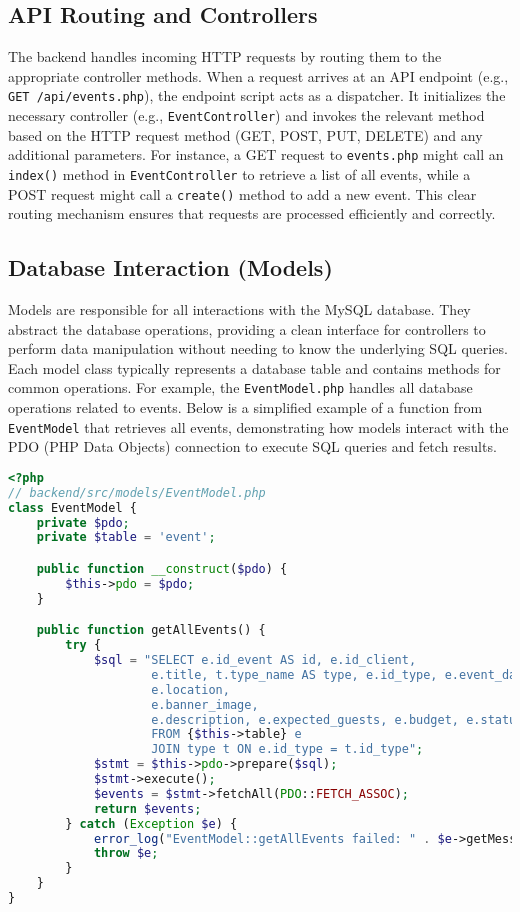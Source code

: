 \documentclass{report}
\begin{document}
\subsection{API Routing and Controllers}
\label{sec:api_routing_controllers}
The backend handles incoming HTTP requests by routing them to the appropriate controller methods. When a request arrives at an API endpoint (e.g., \texttt{GET /api/events.php}), the endpoint script acts as a dispatcher. It initializes the necessary controller (e.g., \texttt{EventController}) and invokes the relevant method based on the HTTP request method (GET, POST, PUT, DELETE) and any additional parameters. For instance, a GET request to \texttt{events.php} might call an \texttt{index()} method in \texttt{EventController} to retrieve a list of all events, while a POST request might call a \texttt{create()} method to add a new event. This clear routing mechanism ensures that requests are processed efficiently and correctly.

\subsection{Database Interaction (Models)}
\label{sec:database_interaction_models}
Models are responsible for all interactions with the MySQL database. They abstract the database operations, providing a clean interface for controllers to perform data manipulation without needing to know the underlying SQL queries. Each model class typically represents a database table and contains methods for common operations. For example, the \texttt{EventModel.php} handles all database operations related to events. Below is a simplified example of a function from \texttt{EventModel} that retrieves all events, demonstrating how models interact with the PDO (PHP Data Objects) connection to execute SQL queries and fetch results.

\begin{lstlisting}[caption={Code Snippet 4.1: \texttt{getAllEvents()} function from \texttt{EventModel.php}, demonstrating database retrieval.},label={lst:getAllEvents},language=PHP]
<?php
// backend/src/models/EventModel.php
class EventModel {
    private $pdo;
    private $table = 'event';

    public function __construct($pdo) {
        $this->pdo = $pdo;
    }

    public function getAllEvents() {
        try {
            $sql = "SELECT e.id_event AS id, e.id_client,
                    e.title, t.type_name AS type, e.id_type, e.event_date,
                    e.location,
                    e.banner_image,
                    e.description, e.expected_guests, e.budget, e.status
                    FROM {$this->table} e
                    JOIN type t ON e.id_type = t.id_type";
            $stmt = $this->pdo->prepare($sql);
            $stmt->execute();
            $events = $stmt->fetchAll(PDO::FETCH_ASSOC);
            return $events;
        } catch (Exception $e) {
            error_log("EventModel::getAllEvents failed: " . $e->getMessage());
            throw $e;
        }
    }
}
\end{lstlisting}
\end{document}
